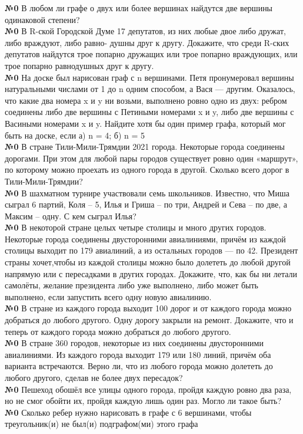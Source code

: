 \documentclass[12 pt, a4paper]{article}%
\newcommand{\task}[1]{{{\vspace{0.6cm} \vspace{-2ex} \textbf{№{#1}}  }}}
\begin{document}
	\newpage
	\task{0} В любом ли графе о двух или более вершинах найдутся две вершины одинаковой степени?\\
	
	\task{0} В R-ской Городской Думе 17 депутатов, из них любые двое либо дружат, либо враждуют, либо равно-
	душны друг к другу. Докажите, что среди R-ских депутатов найдутся трое попарно дружащих или трое попарно враждующих,	или трое попарно равнодушных друг к другу.\\
	\task{0} На доске был нарисован граф с n вершинами. Петя пронумеровал вершины натуральными числами от 1 до n
	одним способом, а Вася — другим. Оказалось, что какие два номера x и y ни возьми, выполнено ровно одно из двух: ребром
	соединены либо две вершины с Петиными номерами x и y, либо две вершины с Васиными номерами x и y. Найдите хотя бы
	один пример графа, который мог быть на доске, если а) n = 4; б) n = 5\\
	
	\task{0} В стране Тили-Мили-Трямдии 2021 города. Некоторые города
	соединены дорогами. При этом для любой пары городов существует ровно один
	«маршрут», по которому можно проехать из одного города в другой. Сколько
	всего дорог в Тили-Мили-Трямдии?\\
	\task{0} В шахматном турнире участвовали семь школьников. Известно, что
	Миша сыграл 6 партий, Коля – 5, Илья и Гриша – по три, Андрей и Сева – по две,
	а Максим – одну. С кем сыграл Илья?\\
	\task{0} В некоторой стране целых четыре столицы и много других городов. Некоторые города соединены двусторонними
	авиалиниями, причём из каждой столицы выходит по 179 авиалиний, а из остальных городов — по 42. Президент страны хочет,чтобы из каждой столицы можно было долететь до любой другой напрямую или с пересадками в других городах. Докажите, что, как бы ни летали самолёты, желание президента либо уже выполнено, либо может быть выполнено, если запустить всего одну новую авиалинию.\\
	\task{0} В стране из каждого города выходит 100 дорог и от каждого города
	можно добраться до любого другого. Одну дорогу закрыли на ремонт.
	Докажите, что и теперь от каждого города можно добраться до любого другого.\\
	\task{0} В стране 360 городов, некоторые из них соединены двусторонними авиалиниями. Из каждого города выходит
	179 или 180 линий, причём оба варианта встречаются. Верно ли, что из любого города можно долететь до любого другого,
	сделав не более двух пересадок?\\
	\task{0} Пешеход обошёл все улицы одного города, пройдя каждую ровно два
	раза, но не смог обойти их, пройдя каждую лишь один раз. Могло ли такое быть?\\
	\task{0}Сколько ребер нужно нарисовать в графе с 6 вершинами, чтобы
	треугольник(и) не был(и) подграфом(ми) этого графа\\
\end{document}
